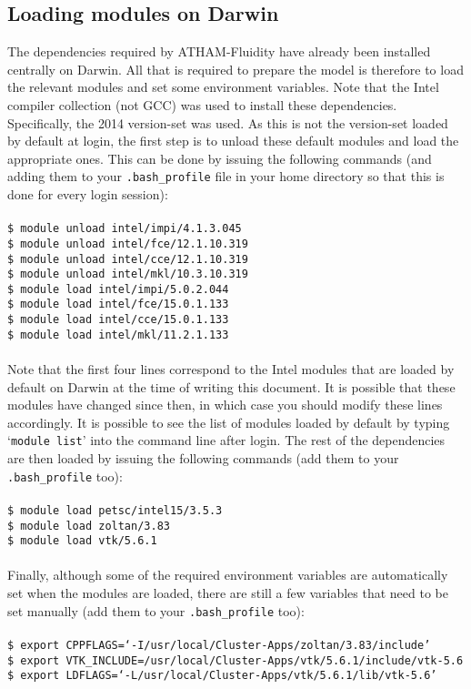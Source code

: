 \documentclass[10pt,a4paper]{article}
\newcommand\tab[1][0.5cm]{\hspace*{#1}}
\begin{document}
\subsection{Loading modules on Darwin} \label{Darwin}
The dependencies required by ATHAM-Fluidity have already been installed centrally on Darwin. All that is required to prepare the model is therefore to load the relevant modules and set some environment variables. Note that the Intel compiler collection (not GCC) was used to install these dependencies. Specifically, the 2014 version-set was used. As this is not the version-set loaded by default at login, the first step is to unload these default modules and load the appropriate ones. This can be done by issuing the following commands (and adding them to your \texttt{.bash\_profile} file in your home directory so that this is done for every login session):\\\\
\tab \texttt{\$ module unload intel/impi/4.1.3.045}\\
\tab \texttt{\$ module unload intel/fce/12.1.10.319}\\
\tab \texttt{\$ module unload intel/cce/12.1.10.319}\\
\tab \texttt{\$ module unload intel/mkl/10.3.10.319}\\
\tab \texttt{\$ module load intel/impi/5.0.2.044}\\
\tab \texttt{\$ module load intel/fce/15.0.1.133}\\
\tab \texttt{\$ module load intel/cce/15.0.1.133}\\
\tab \texttt{\$ module load intel/mkl/11.2.1.133}\\\\
Note that the first four lines correspond to the Intel modules that are loaded by default on Darwin at the time of writing this document. It is possible that these modules have changed since then, in which case you should modify these lines accordingly. It is possible to see the list of modules loaded by default by typing `\texttt{module list}' into the command line after login. The rest of the dependencies are then loaded by issuing the following commands (add them to your \texttt{.bash\_profile} too):\\\\
\tab \texttt{\$ module load petsc/intel15/3.5.3}\\
\tab \texttt{\$ module load zoltan/3.83}\\
\tab \texttt{\$ module load vtk/5.6.1}\\\\
Finally, although some of the required environment variables are automatically set when the modules are loaded, there are still a few variables that need to be set manually (add them to your \texttt{.bash\_profile} too):\\\\
\tab \texttt{\$ export CPPFLAGS=`-I/usr/local/Cluster-Apps/zoltan/3.83/include'}\\
\tab \texttt{\$ export VTK\_INCLUDE=/usr/local/Cluster-Apps/vtk/5.6.1/include/vtk-5.6}\\
\tab \texttt{\$ export LDFLAGS=`-L/usr/local/Cluster-Apps/vtk/5.6.1/lib/vtk-5.6'}
\end{document}
